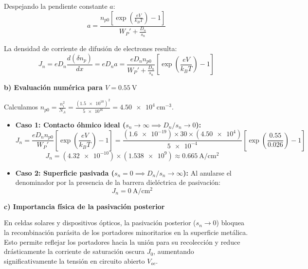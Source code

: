 \begin{problema}
Despejando la pendiente constante $a$:
\[
a = \frac{n_{p0} \left[ \exp\left(\frac{e V}{k_B T}\right) - 1 \right]}{W_P' + \frac{D_n}{s_n}}
\]

La densidad de corriente de difusión de electrones resulta:
\[
J_n = e D_n \frac{d(\delta n_p)}{dx} = e D_n a = \frac{e D_n n_{p0}}{W_P' + \frac{D_n}{s_n}} \left[ \exp\left(\frac{e V}{k_B T}\right) - 1 \right]
\]

\textbf{b) Evaluación numérica para $V = \SI{0.55}{\V}$}

Calculamos $n_{p0} = \frac{n_i^2}{N_A} = \frac{(\num{1.5e10})^2}{\num{5e16}} = \SI{4.50e4}{\cm^{-3}}$.

\begin{itemize}
    \item \textbf{Caso 1: Contacto óhmico ideal ($s_n \to \infty \implies D_n / s_n \to 0$):}
    \[
    J_n = \frac{e D_n n_{p0}}{W_P'} \left[ \exp\left(\frac{e V}{k_B T}\right) - 1 \right] = \frac{(\num{1.6e-19}) \times 30 \times (\num{4.50e4})}{\num{5e-4}} \left[ \exp\left(\frac{0.55}{0.026}\right) - 1 \right]
    \]
    \[
    J_n = (\num{4.32e-10}) \times (\num{1.538e9}) \approx \SI{0.665}{\A\per\cm^2}
    \]

    \item \textbf{Caso 2: Superficie pasivada ($s_n = 0 \implies D_n / s_n \to \infty$):}
    Al anularse el denominador por la presencia de la barrera dieléctrica de pasivación:
    \[
    J_n = \SI{0}{\A\per\cm^2}
    \]
\end{itemize}

\textbf{c) Importancia física de la pasivación posterior}

En celdas solares y dispositivos ópticos, la pasivación posterior ($s_n \to 0$) bloquea la recombinación parásita de los portadores minoritarios en la superficie metálica. Esto permite reflejar los portadores hacia la unión para su recolección y reduce drásticamente la corriente de saturación oscura $J_0$, aumentando significativamente la tensión en circuito abierto $V_{oc}$.
\end{problema}

